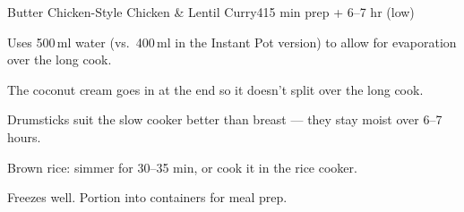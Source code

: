 \begin{recipebox}{Butter Chicken-Style Chicken \& Lentil Curry}{4}{15 min prep + 6--7 hr (low)}
\begin{notelist}
  \item Uses 500\,ml water (vs.\ 400\,ml in the Instant Pot version) to allow for evaporation over the long cook.
  \item The coconut cream goes in at the end so it doesn't split over the long cook.
  \item Drumsticks suit the slow cooker better than breast --- they stay moist over 6--7 hours.
  \item Brown rice: simmer for 30--35 min, or cook it in the rice cooker.
  \item Freezes well. Portion into containers for meal prep.
\end{notelist}

\end{recipebox}
